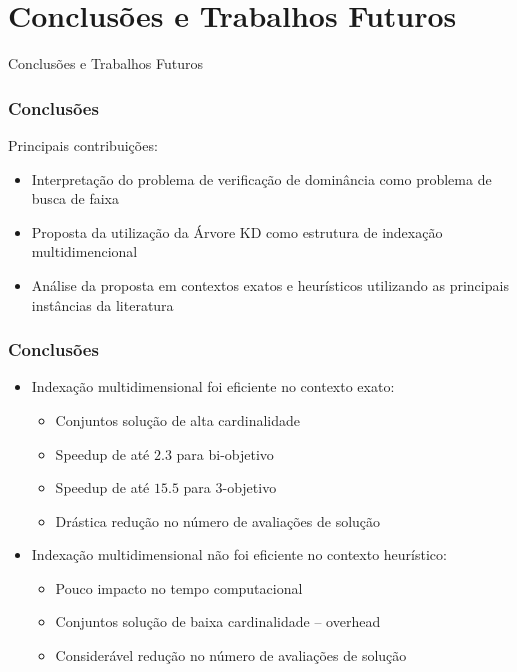 \documentclass[10pt,xcolor=table,fleqn]{beamer}
\newcommand{\mytitle}[1]{
  \begin{center}
    \color{defblue}
    { \LARGE #1 }
  \end{center}
}
\begin{document}
\section{Conclusões e Trabalhos Futuros}

\begin{frame}
	\mytitle{Conclusões e Trabalhos Futuros}
\end{frame}

\begin{frame}
	\frametitle{Conclusões}
  \begin{block}{Principais contribuições:}
    \begin{itemize}
      \item{ Interpretação do problema de verificação de dominância como problema de busca de faixa }
      \item{ Proposta da utilização da Árvore KD como estrutura de indexação multidimencional }
      \item{ Análise da proposta em contextos exatos e heurísticos utilizando as principais instâncias da literatura}
    \end{itemize}
  \end{block}
\end{frame}

\begin{frame}
	\frametitle{Conclusões}
  \begin{itemize}
    \item{ Indexação multidimensional foi eficiente no contexto exato: } \pause
    \begin{itemize}
      \item{ Conjuntos solução de alta cardinalidade } \pause
      \item{ Speedup de até $2.3$ para bi-objetivo } \pause
      \item{ Speedup de até $15.5$ para 3-objetivo } \pause
      \item{ Drástica redução no número de avaliações de solução }
    \end{itemize}
    \pause
    \item{ Indexação multidimensional não foi eficiente no contexto heurístico: } \pause
    \begin{itemize}
      \item{ Pouco impacto no tempo computacional } \pause
      \item{ Conjuntos solução de baixa cardinalidade -- overhead } \pause
      \item{ Considerável redução no número de avaliações de solução }
    \end{itemize}
  \end{itemize}
\end{frame}
\end{document}
